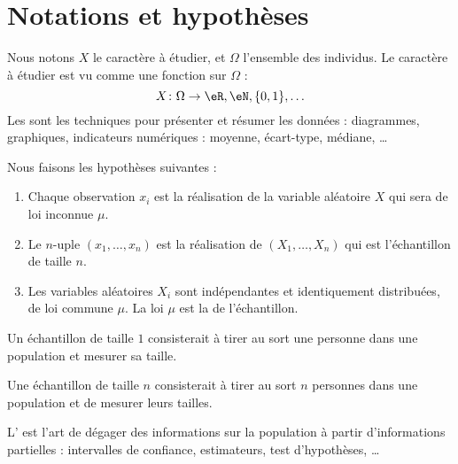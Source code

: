 
\section{Notations et hypothèses}

Nous notons \( X\) le caractère à étudier, et \( \Omega\) l'ensemble des individus. Le caractère à étudier est vu comme une fonction sur \( \Omega\) :
\begin{equation}
    X\colon \Omega\to \eR,\eN,\{ 0,1 \},\ldots
\end{equation}
Les  sont les techniques pour présenter et résumer les données : diagrammes, graphiques, indicateurs numériques : moyenne, écart-type, médiane, \ldots

Nous faisons les hypothèses suivantes :
\begin{enumerate}
    \item
        Chaque observation \( x_i\) est la réalisation de la variable aléatoire \( X\) qui sera de loi inconnue \( \mu\).
    \item
        Le \( n\)-uple \( (x_1,\ldots,x_n)\) est la réalisation de \( (X_1,\ldots,X_n)\) qui est l'échantillon de taille \( n\).
    \item
        Les variables aléatoires \( X_i\) sont indépendantes et identiquement distribuées, de loi commune \( \mu\). La loi \( \mu\) est la  de l'échantillon.
\end{enumerate}

\begin{example}
    Un échantillon de taille \( 1\) consisterait à tirer au sort une personne dans une population et mesurer sa taille.
\end{example}

\begin{example}
    Une échantillon de taille \( n\) consisterait à tirer au sort \( n\) personnes dans une population et de mesurer leurs tailles.
\end{example}

L' est l'art de dégager des informations sur la population à partir d'informations partielles : intervalles de confiance, estimateurs, test d'hypothèses, \ldots

